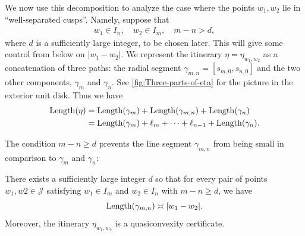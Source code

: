 We now use this decomposition to analyze the case where the points $w_1,w_2$ lie in ``well-separated cusps''. Namely, suppose that
\begin{align} \label{parabolic separation}
	w_1 \in I_n, \quad w_2 \in I_m, \quad m-n > d,
\end{align}
where $d$ is a sufficiently large integer, to be chosen later. 
This will give some control from below on $|w_1-w_2|$. 
We represent the itinerary $\eta=\eta_{w_1,w_2}$ as a concatenation of three paths: the radial segment $\gamma_{m,n}=[s_{m,0},s_{n,0}]$ and the two other components, $\gamma _m$ and $\gamma_n$. See \cref{fig:Three-parts-of-eta} for the picture in the exterior unit disk.
Thus we have
\begin{equation}
\begin{split}    
\operatorname{Length}(\eta) &=\operatorname{Length}(\gamma_m)+\operatorname{Length}(\gamma_{m,n})+\operatorname{Length}(\gamma_n) \\ 
&= \operatorname{Length}(\gamma_m)+\ell_m + \dots +\ell_{n-1}+\operatorname{Length}(\gamma_n).
\end{split}
\end{equation}



The condition $m-n \geq d$ prevents the line segment $\gamma _{m,n}$ from being small in comparison to $\gamma_m$ and $\gamma_n$:
\begin{proposition}
\label {case-3-proof}
There exists a sufficiently large integer $d$ so that for every pair of points $w_1,w2 \in \mathcal J$ satisfying $w_1\in I_m$ and $w_2 \in I_n$ with $m-n \geq d$, we have
	\begin{equation}
	\label{eq:triangle-comparison}
		\operatorname{Length}(\gamma_{m,n}) \asymp |w_1-w_2|.
	\end{equation}
Moreover, the itinerary $\eta_{w_1,w_2}$ is a quasiconvexity certificate.
\end{proposition}

